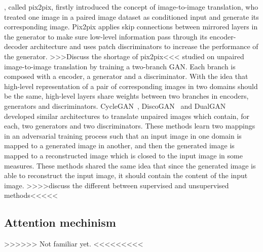 \cite{pix2pix}, called pix2pix, firstly introduced the concept of image-to-image translation, who treated one image in a paired image dataset as conditioned input and generate its corresponding image. 
Pix2pix applies skip connections \cite{Unet} between mirrored layers in the generator to make sure low-level information pass through its encoder-decoder architecture and uses patch discriminators \cite{PatchDicriminator} to increase the performance of the generator. >>>Discuss the shortage of pix2pix<<<
%
\cite{UNIT} studied on unpaired image-to-image translation by training a two-branch GAN. Each branch is composed with a encoder, a generator and a discriminator. With the idea that high-level representation of a pair of corresponding images in two domains should be the same, high-level layers share weights between two branches in encoders, generators and discriminators. 
%
CycleGAN~\cite{CycleGAN}, DiscoGAN~\cite{DiscoGAN} and DualGAN~\cite{DualGAN} developed similar architectures to translate unpaired images which contain, for each, two generators and two discriminators. These methods learn two mappings in an adversarial training process such that an input image in one domain is mapped to a generated image in another, and then the generated image is mapped to a reconstructed image which is closed to the input image in some measures. These methods shared the same idea that since the generated image is able to reconstruct the input image, it should contain the content of the input image. >>>>discuss the different between supervised and unsupervised methods<<<<<

\subsection{Attention mechinism}
>>>>>> Not familiar yet. <<<<<<<<<